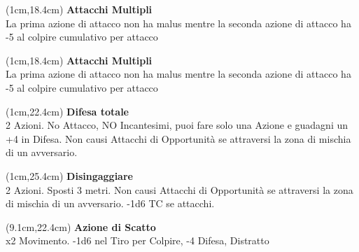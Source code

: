 \documentclass[a4paper,12 pt,openany]{book}
\begin{document}
\begin{textblock*}{4cm}(1cm,18.4cm) %
	\textbf{Attacchi Multipli}\\
La prima azione di attacco non ha malus mentre la seconda azione di attacco ha -5 al colpire cumulativo per attacco
\end{textblock*}


\begin{textblock*}{4cm}(1cm,18.4cm) %
	\textbf{Attacchi Multipli}\\
	La prima azione di attacco non ha malus mentre la seconda azione di attacco ha -5 al colpire cumulativo per attacco
\end{textblock*}




\begin{textblock*}{8cm}(1cm,22.4cm) %
\textbf{Difesa totale}\\
2 Azioni. No Attacco, NO Incantesimi, puoi fare solo una Azione e guadagni un +4 in Difesa. Non causi Attacchi di Opportunità se attraversi la zona di mischia di un avversario.
\end{textblock*}

\begin{textblock*}{8cm}(1cm,25.4cm) %
\textbf{Disingaggiare}\\
2 Azioni. Sposti 3 metri. Non causi Attacchi di Opportunità se attraversi la zona di mischia di un avversario. -1d6 TC se attacchi.
\end{textblock*}



\begin{textblock*}{6.7cm}(9.1cm,22.4cm) %
\textbf{Azione di Scatto}\\
x2 Movimento. -1d6 nel Tiro per Colpire, -4 Difesa, Distratto
\end{textblock*}
\end{document}
